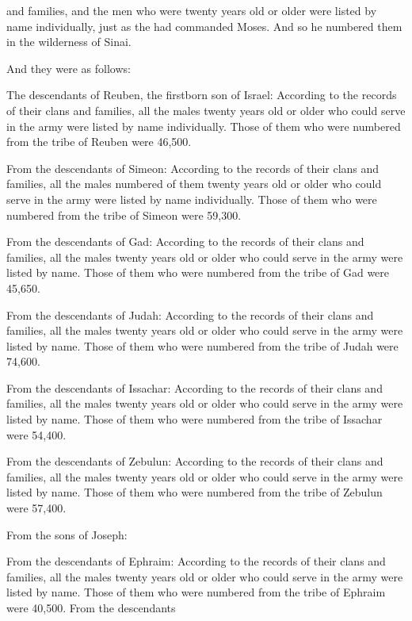 {and families,
and the men
who were twenty
years
old or older
were listed
by name
individually,
just
as the
{}
had commanded
Moses.
And so he numbered
them in the wilderness
of Sinai.
\par }{\PP {}And they were as follows:
\par }{\PP The descendants
of Reuben,
the firstborn son
of Israel: According to the records
of their clans
and families,
all
the males
twenty
years
old or older
who could serve
in the army
were listed
by name
individually.
Those of them who were numbered
from the tribe
of Reuben
were 46,500.
\par }{\PP {}From the descendants
of Simeon: According to the records
of their clans
and families,
all
the males
numbered
of them twenty
years
old or older
who could serve
in the army
were listed
by name
individually.
Those of them who were numbered
from the tribe
of Simeon
were 59,300.
\par }{\PP From the descendants
of Gad: According to the records
of their clans
and families,
all
the males
twenty
years
old or older
who could serve
in the army
were listed
by name.
Those of them who were numbered
from the tribe
of Gad
were 45,650.
\par }{\PP {}From the descendants
of Judah: According to the records
of their clans
and families,
all
the males
twenty
years
old or older
who could serve
in the army
were listed
by name.
Those of them who were numbered
from the tribe
of Judah
were 74,600.
\par }{\PP {}From the descendants
of Issachar: According to the records
of their clans
and families,
all
the males
twenty
years
old or older
who could serve
in the army
were listed
by name.
Those of them who were numbered
from the tribe
of Issachar
were 54,400.
\par }{\PP {}From the descendants
of Zebulun: According to the records
of their clans
and families,
all
the males
twenty
years
old or older
who could serve
in the army
were listed
by name.
Those of them who were numbered
from the tribe
of Zebulun
were 57,400.
\par }{\PP {}From the sons
of Joseph:
\par }{\PP From the descendants
of Ephraim: According to the records
of their clans
and families,
all
the males
twenty
years
old or older
who could serve
in the army
were listed
by name.
Those of them who were numbered
from the tribe
of Ephraim
were 40,500.
From the descendants
}
